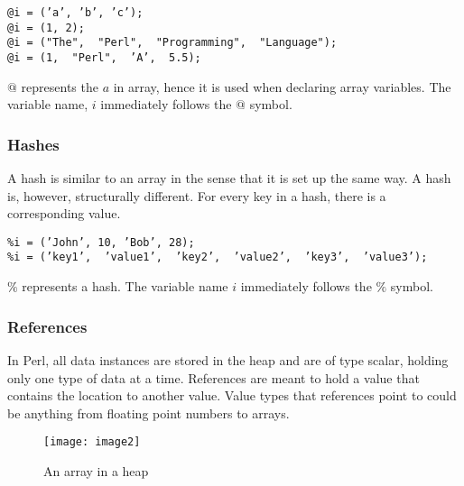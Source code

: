 \documentclass[11pt,a4paper]{article}
\begin{document}
                \begin{tabbing}
                \texttt{@i = ('a',\ 'b',\ 'c');}\\
                \texttt{@i = (1,\ 2);}\\
                \texttt{@i = ("The", \ "Perl", \ "Programming", \ "Language");}\\
                \texttt{@i = (1, \ "Perl", \ 'A', \ 5.5); }\\
                \end{tabbing}
                                
                \noindent  $@$ represents the $a$ in array, hence it is used when declaring array variables. The variable name, $i$ immediately follows the $@$ symbol.
                
                \subsubsection{Hashes}
                A hash is similar to an array in the sense that it is set up the same way. A hash is, however, structurally different. For every key in a hash, there is a corresponding value.
                
                \begin{tabbing}
                \texttt{\%i = ('John',\ 10,\ 'Bob',\ 28);}\\
                \texttt{\%i = ('key1', \ 'value1', \ 'key2', \ 'value2', \ 'key3', \ 'value3');}\\
                \end{tabbing}
                
                \noindent  $\%$ represents a hash. The variable name $i$ immediately follows the $\%$ symbol.
                
                \subsubsection{References}
                In Perl, all data instances are stored in the heap and are of type scalar, holding only one type of data at a time. References are meant to hold a value that contains the location to another value. Value types that references point to could be anything from floating point numbers to arrays. \\
                
                \newpage
                \begin{figure}[h!]
                        \begin{center}
                        \texttt{[image: image2]}
                                        \begin{center}
                                                \caption{An array in a heap}
                                                \cite{03}
                                        \end{center}
                        \end{center}
                \end{figure}
                
\end{document}
